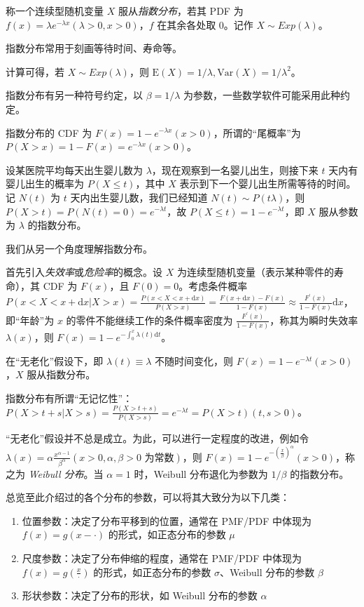 \documentclass[../main.tex]{subfiles}
\begin{document}
\begin{definition}\label{def:2.5.3}
    称一个连续型随机变量 $X$ 服从\emph{指数分布}，若其 PDF 为 $f(x)=\lambda e^{-\lambda x}(\lambda>0,x>0)$，$f$ 在其余各处取 $0$。记作 $X\sim Exp(\lambda)$。
\end{definition}

指数分布常用于刻画等待时间、寿命等。

计算可得，若 $X\sim Exp(\lambda)$，则 $\mathrm{E}(X)=1/\lambda,\mathrm{Var}(X)=1/\lambda^2$。

指数分布有另一种符号约定，以 $\beta=1/\lambda$ 为参数，一些数学软件可能采用此种约定。

指数分布的 CDF 为 $F(x)=1-e^{-\lambda x}(x>0)$，所谓的“尾概率”为 $P(X>x)=1-F(x)=e^{-\lambda x}(x>0)$。

\begin{example}
    设某医院平均每天出生婴儿数为 $\lambda$，现在观察到一名婴儿出生，则接下来 $t$ 天内有婴儿出生的概率为 $P(X\leq t)$，其中 $X$ 表示到下一个婴儿出生所需等待的时间。\\
    记 $N(t)$ 为 $t$ 天内出生婴儿数，我们已经知道 $N(t)\sim P(t\lambda)$，则 $P(X>t)=P(N(t)=0)=e^{-\lambda t}$，故 $P(X\leq t)=1-e^{-\lambda t}$，即 $X$ 服从参数为 $\lambda$ 的指数分布。
\end{example}

我们从另一个角度理解指数分布。

首先引入\emph{失效率}或\emph{危险率}的概念。设 $X$ 为连续型随机变量（表示某种零件的寿命），其 CDF 为 $F(x)$，且 $F(0)=0$。考虑条件概率 $P(x<X<x+\mathrm{d}x|X>x)=\frac{P(x<X<x+\mathrm{d}x)}{P(X>x)}=\frac{F(x+\mathrm{d}x)-F(x)}{1-F(x)}\approx\frac{F^\prime(x)}{1-F(x)}\mathrm{d}x$，即“年龄”为 $x$ 的零件不能继续工作的条件概率密度为 $\frac{F^\prime(x)}{1-F(x)}$，称其为瞬时失效率 $\lambda(x)$，则 $F(x)=1-e^{-\int_0^x\lambda(t)\mathrm{d}t}$。

在“无老化”假设下，即 $\lambda(t)\equiv \lambda$ 不随时间变化，则 $F(x)=1-e^{-\lambda t}(x>0)$，$X$ 服从指数分布。

指数分布有所谓“无记忆性”：$P(X>t+s|X>s)=\frac{P(X>t+s)}{P(X>s)}=e^{-\lambda t}=P(X>t)(t,s>0)$。

“无老化”假设并不总是成立。为此，可以进行一定程度的改进，例如令 $\lambda(x)=\alpha\frac{x^{\alpha-1}}{\beta^\alpha}(x>0,\alpha,\beta>0\text{ 为常数})$，则 $F(x)=1-e^{-(\frac{x}{\beta})^\alpha}(x>0)$，称之为 \emph{Weibull 分布}。当 $\alpha=1$ 时，Weibull 分布退化为参数为 $1/\beta$ 的指数分布。

总览至此介绍过的各个分布的参数，可以将其大致分为以下几类：
\begin{enumerate}
    \item 位置参数：决定了分布平移到的位置，通常在 PMF/PDF 中体现为 $f(x)=g(x-\cdot)$ 的形式，如正态分布的参数 $\mu$
    \item 尺度参数：决定了分布伸缩的程度，通常在 PMF/PDF 中体现为 $f(x)=g(\frac x\cdot)$ 的形式，如正态分布的参数 $\sigma$、Weibull 分布的参数 $\beta$
    \item 形状参数：决定了分布的形状，如 Weibull 分布的参数 $\alpha$
\end{enumerate}
\end{document}
